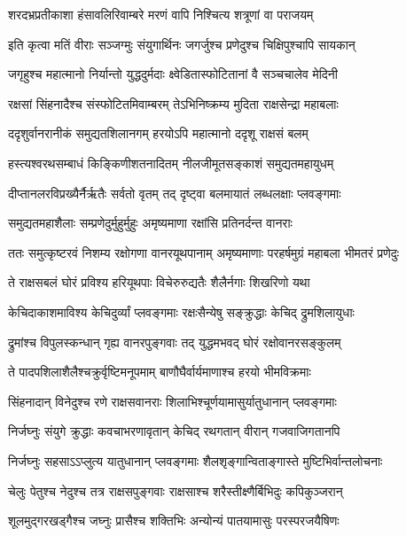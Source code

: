 \twolineshloka
{शरदभ्रप्रतीकाशा हंसावलिरिवाम्बरे}
{मरणं वापि निश्चित्य शत्रूणां वा पराजयम्} %

\twolineshloka
{इति कृत्वा मतिं वीराः सञ्जग्मुः संयुगार्थिनः}
{जगर्जुश्च प्रणेदुश्च चिक्षिपुश्चापि सायकान्} %

\twolineshloka
{जगृहुश्च महात्मानो निर्यान्तो युद्धदुर्मदाः}
{क्ष्वेडितास्फोटितानां वै सञ्चचालेव मेदिनी} %

\twolineshloka
{रक्षसां सिंहनादैश्च संस्फोटितमिवाम्बरम्}
{तेऽभिनिष्क्रम्य मुदिता राक्षसेन्द्रा महाबलाः} %

\twolineshloka
{ददृशुर्वानरानीकं समुद्यतशिलानगम्}
{हरयोऽपि महात्मानो ददृशू राक्षसं बलम्} %

\twolineshloka
{हस्त्यश्वरथसम्बाधं किङ्किणीशतनादितम्}
{नीलजीमूतसङ्काशं समुद्यतमहायुधम्} %

\twolineshloka
{दीप्तानलरविप्रख्यैर्नैर्ऋतैः सर्वतो वृतम्}
{तद् दृष्ट्वा बलमायातं लब्धलक्षाः प्लवङ्गमाः} %

\twolineshloka
{समुद्यतमहाशैलाः सम्प्रणेदुर्मुहुर्मुहुः}
{अमृष्यमाणा रक्षांसि प्रतिनर्दन्त वानराः} %

\twolineshloka
{ततः समुत्कृष्टरवं निशम्य रक्षोगणा वानरयूथपानाम्}
{अमृष्यमाणाः परहर्षमुग्रं महाबला भीमतरं प्रणेदुः} %

\twolineshloka
{ते राक्षसबलं घोरं प्रविश्य हरियूथपाः}
{विचेरुरुद्यतैः शैलैर्नगाः शिखरिणो यथा} %

\twolineshloka
{केचिदाकाशमाविश्य केचिदुर्व्यां प्लवङ्गमाः}
{रक्षःसैन्येषु सङ्क्रुद्धाः केचिद् द्रुमशिलायुधाः} %

\twolineshloka
{द्रुमांश्च विपुलस्कन्धान् गृह्य वानरपुङ्गवाः}
{तद् युद्धमभवद् घोरं रक्षोवानरसङ्कुलम्} %

\twolineshloka
{ते पादपशिलाशैलैश्चक्रुर्वृष्टिमनूपमाम्}
{बाणौघैर्वार्यमाणाश्च हरयो भीमविक्रमाः} %

\twolineshloka
{सिंहनादान् विनेदुश्च रणे राक्षसवानराः}
{शिलाभिश्चूर्णयामासुर्यातुधानान् प्लवङ्गमाः} %

\twolineshloka
{निर्जघ्नुः संयुगे क्रुद्धाः कवचाभरणावृतान्}
{केचिद् रथगतान् वीरान् गजवाजिगतानपि} %

\twolineshloka
{निर्जघ्नुः सहसाऽऽप्लुत्य यातुधानान् प्लवङ्गमाः}
{शैलशृङ्गान्विताङ्गास्ते मुष्टिभिर्वान्तलोचनाः} %

\twolineshloka
{चेलुः पेतुश्च नेदुश्च तत्र राक्षसपुङ्गवाः}
{राक्षसाश्च शरैस्तीक्ष्णैर्बिभिदुः कपिकुञ्जरान्} %

\twolineshloka
{शूलमुद्गरखड्गैश्च जघ्नुः प्रासैश्च शक्तिभिः}
{अन्योन्यं पातयामासुः परस्परजयैषिणः} %

